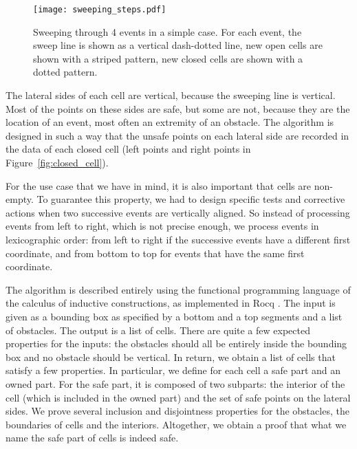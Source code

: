 \documentclass[a4paper, USenglish, cleveref, autoref, thm-restate, final]{lipics-v2021}
\begin{document}
\begin{figure}[h]
\begin{center}
\texttt{[image: sweeping\_steps.pdf]}
\end{center}
\caption{Sweeping through 4 events in a simple case.  For each event,
  the sweep line is shown as a vertical dash-dotted line,
  new open cells are shown with a striped pattern, new closed cells
  are shown with a dotted pattern.}
\label{fig:sweeping_steps}
\end{figure}

The lateral sides of each cell are vertical, because the sweeping line
is vertical.  Most of the points on these sides are safe, but
some are not,
because they are the location of an event, most often an extremity of an
obstacle.  The algorithm is designed in such a way that the unsafe
points on each lateral side are recorded in the data of each closed
cell (left points and right points in Figure~\ref{fig:closed_cell}).

For the use case that we have in mind, it is also important that cells
are non-empty.  To guarantee this property, we had to design specific
tests and corrective actions when two successive events are vertically
aligned.  So instead of processing events from left to right, which is
not precise enough, we process events in lexicographic order: from left to
right if the successive events have a different first coordinate, and
from bottom to top for events that have the same first coordinate.

The algorithm is described entirely using the functional programming
language of the calculus of inductive constructions, as implemented in
Rocq \cite{the_coq_development_team_2024_14542673}.  The input is given as a bounding box as specified by a bottom and
a top segments and a list of obstacles.
The output is a list of cells.  There are quite a few expected
properties for the inputs: the obstacles should all be entirely inside
the bounding box and no obstacle should be vertical.  In return, we
obtain a list of cells that satisfy a few properties.  In particular,
we define for each cell a safe part and an owned part.  For the safe part,
it is composed of two subparts: the interior of the cell (which is included in
the owned part) and the set of safe points on the lateral sides.  We
prove several inclusion and disjointness properties for the obstacles, the
boundaries of cells and the interiors.  Altogether, we obtain a proof that
what we name the safe part of cells is indeed safe.
\end{document}
